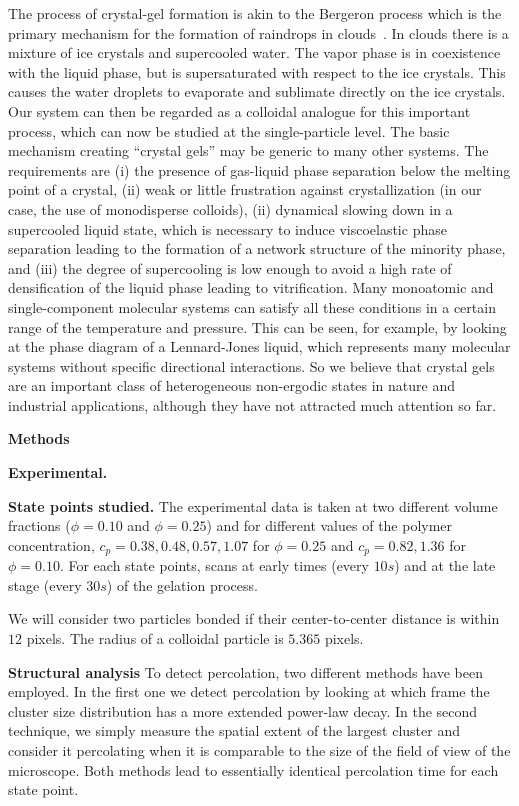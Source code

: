 \documentclass[twocolumn,superscriptaddress,showpacs,preprintnumbers,
amsmath,amssymb,prl]{revtex4-1}
\begin{document}
The process of crystal-gel formation is akin to the Bergeron process which is the primary mechanism for the formation of raindrops in clouds~\cite{glickman2000glossary}.
In clouds there is a mixture of ice crystals and supercooled water. The vapor phase is in coexistence with the liquid phase, but is supersaturated
with respect to the ice crystals. This causes the water droplets to evaporate and sublimate directly on the ice crystals. Our system can then
be regarded as a colloidal analogue for this important process, which can now be studied at the single-particle level.
The basic mechanism creating ``crystal gels'' may be generic to many other
systems. The requirements are (i) the presence of gas-liquid phase separation below the melting point of a crystal, (ii) 
weak or little frustration against crystallization (in our case, the use of monodisperse colloids), 
(ii) dynamical slowing down in a supercooled liquid state, which is necessary to induce viscoelastic phase separation leading to the formation 
of a network structure of the minority phase, and (iii) the degree of supercooling is low enough to avoid a high rate of densification of the liquid phase 
leading to vitrification.   
Many monoatomic and single-component molecular systems can satisfy all these conditions in a certain range of the temperature and pressure. 
This can be seen, for example, by looking at the phase diagram of a Lennard-Jones liquid, which represents many molecular systems 
without specific directional interactions. So we believe that crystal gels are an important class of heterogeneous non-ergodic states in nature 
and industrial applications, although they have not attracted much attention so far.  

\vspace{2cm}
\noindent
{\bf \large Methods}

\noindent
{\bf Experimental.}

\noindent
{\bf State points studied. }
The experimental data is taken at two different volume fractions ($\phi=0.10$ and $\phi=0.25$) and for different values
of the polymer concentration, $c_p=0.38,0.48,0.57,1.07$ for $\phi=0.25$ and $c_p=0.82,1.36$ for $\phi=0.10$.
For each state points, scans at early times (every $10s$) and at the late stage (every $30s$) of the gelation process.

We will consider two particles bonded if their center-to-center distance is within $12$ pixels. The radius of a colloidal
particle is $5.365$ pixels.

\noindent
{\bf Structural analysis}
To detect percolation, two different methods have been employed. In the first one we detect percolation
by looking at which frame the cluster size distribution has a more extended power-law decay. In the second technique,
we simply measure the spatial extent of the largest cluster and consider it percolating when it is comparable to the
size of the field of view of the microscope. Both methods lead to essentially identical percolation time for each state point.




\clearpage
\end{document}

